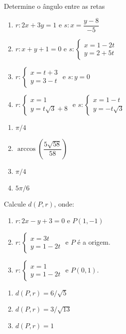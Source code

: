 \documentclass[12pt]{exam}
\begin{document}
\questao{} Determine o ângulo entre as retas
\begin{enumerate}[label=({\alph*})]
    \item $r: 2x + 3y = 1$ e $s: x = \dfrac{y - 8}{-5}$
    \item $r: x + y + 1 = 0$ e $s: \begin{cases} x = 1 - 2t\\y = 2 + 5t\end{cases}$
    \item $r: \begin{cases} x = t + 3\\y = 3 - t\end{cases}$ e $s: y = 0$
    \item $r: \begin{cases} x = 1\\y = t\sqrt{3} + 8\end{cases}$ e $s: \begin{cases} x = 1 - t\\y = -t\sqrt{3}\end{cases}$
\end{enumerate}
\begin{solucao}
    \begin{enumerate}[label=({\alph*})]
        \item $\pi/4$
        \item $\arccos\left(\dfrac{5\sqrt{58}}{58}\right)$
        \item $\pi/4$
        \item $5\pi/6$
    \end{enumerate}
\end{solucao}

\vspace{.3cm}

\questao{} Calcule $d(P,r)$, onde:
\begin{enumerate}[label=({\alph*})]
    \item $r : 2x - y + 3 =0$  e $P(1,-1)$
    \item $r : \begin{cases}x = 3t\\y = 1 - 2t\end{cases}$  e $P$ é a origem.
    \item $r : \begin{cases}x = 1\\y = 1 - 2t\end{cases}$  e $P(0,1)$.
\end{enumerate}
\begin{solucao}
    \begin{enumerate}[label=({\alph*})]
        \item $d(P,r) = 6/\sqrt{5}$
        \item $d(P,r) = 3/\sqrt{13}$
        \item $d(P,r) = 1$
    \end{enumerate}
\end{solucao}
\end{document}
